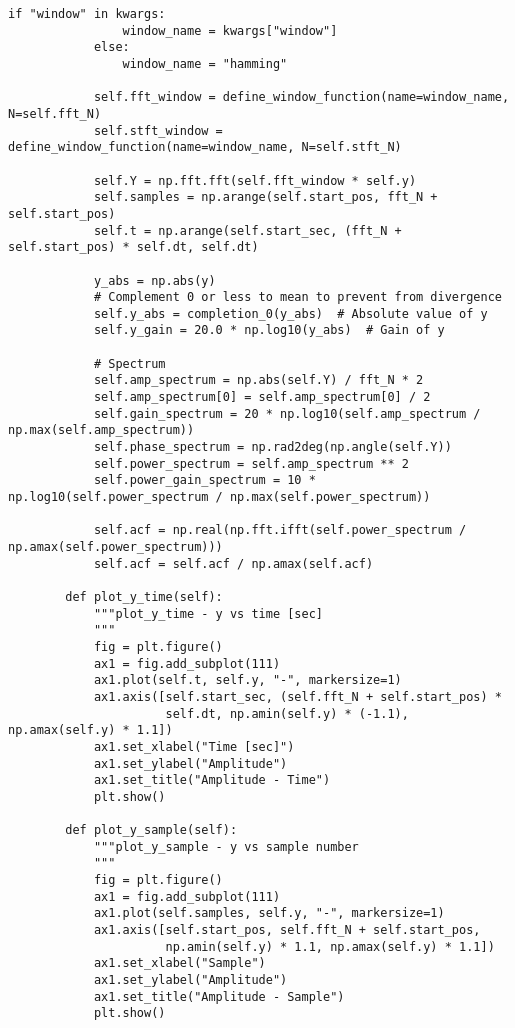 \begin{lstlisting}[caption=plot\_tools.py,label=plot\_tools.py]
            if "window" in kwargs:
                window_name = kwargs["window"]
            else:
                window_name = "hamming"
    
            self.fft_window = define_window_function(name=window_name, N=self.fft_N)
            self.stft_window = define_window_function(name=window_name, N=self.stft_N)
    
            self.Y = np.fft.fft(self.fft_window * self.y)
            self.samples = np.arange(self.start_pos, fft_N + self.start_pos)
            self.t = np.arange(self.start_sec, (fft_N + self.start_pos) * self.dt, self.dt)
    
            y_abs = np.abs(y)
            # Complement 0 or less to mean to prevent from divergence
            self.y_abs = completion_0(y_abs)  # Absolute value of y
            self.y_gain = 20.0 * np.log10(y_abs)  # Gain of y
    
            # Spectrum
            self.amp_spectrum = np.abs(self.Y) / fft_N * 2
            self.amp_spectrum[0] = self.amp_spectrum[0] / 2
            self.gain_spectrum = 20 * np.log10(self.amp_spectrum / np.max(self.amp_spectrum))
            self.phase_spectrum = np.rad2deg(np.angle(self.Y))
            self.power_spectrum = self.amp_spectrum ** 2
            self.power_gain_spectrum = 10 * np.log10(self.power_spectrum / np.max(self.power_spectrum))
    
            self.acf = np.real(np.fft.ifft(self.power_spectrum / np.amax(self.power_spectrum)))
            self.acf = self.acf / np.amax(self.acf)
    
        def plot_y_time(self):
            """plot_y_time - y vs time [sec]
            """
            fig = plt.figure()
            ax1 = fig.add_subplot(111)
            ax1.plot(self.t, self.y, "-", markersize=1)
            ax1.axis([self.start_sec, (self.fft_N + self.start_pos) *
                      self.dt, np.amin(self.y) * (-1.1), np.amax(self.y) * 1.1])
            ax1.set_xlabel("Time [sec]")
            ax1.set_ylabel("Amplitude")
            ax1.set_title("Amplitude - Time")
            plt.show()
    
        def plot_y_sample(self):
            """plot_y_sample - y vs sample number
            """
            fig = plt.figure()
            ax1 = fig.add_subplot(111)
            ax1.plot(self.samples, self.y, "-", markersize=1)
            ax1.axis([self.start_pos, self.fft_N + self.start_pos,
                      np.amin(self.y) * 1.1, np.amax(self.y) * 1.1])
            ax1.set_xlabel("Sample")
            ax1.set_ylabel("Amplitude")
            ax1.set_title("Amplitude - Sample")
            plt.show()
    

\end{lstlisting}

